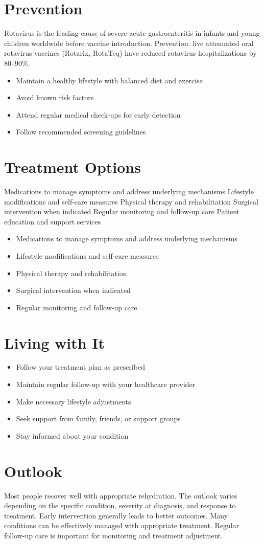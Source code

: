 \section{Prevention}
Rotavirus is the leading cause of severe acute gastroenteritis in infants and young children worldwide before vaccine introduction. Prevention: live attenuated oral rotavirus vaccines (Rotarix, RotaTeq) have reduced rotavirus hospitalizations by 80--90\%.

\begin{itemize}[noitemsep]
  \item Maintain a healthy lifestyle with balanced diet and exercise
  \item Avoid known risk factors
  \item Attend regular medical check-ups for early detection
  \item Follow recommended screening guidelines
\end{itemize}
\section{Treatment Options}
Medications to manage symptoms and address underlying mechanisms Lifestyle modifications and self-care measures Physical therapy and rehabilitation Surgical intervention when indicated Regular monitoring and follow-up care Patient education and support services

\begin{itemize}[noitemsep]
  \item Medications to manage symptoms and address underlying mechanisms
  \item Lifestyle modifications and self-care measures
  \item Physical therapy and rehabilitation
  \item Surgical intervention when indicated
  \item Regular monitoring and follow-up care
\end{itemize}
\section{Living with It}
\begin{itemize}[noitemsep]
  \item Follow your treatment plan as prescribed
  \item Maintain regular follow-up with your healthcare provider
  \item Make necessary lifestyle adjustments
  \item Seek support from family, friends, or support groups
  \item Stay informed about your condition
\end{itemize}
\section{Outlook}
Most people recover well with appropriate rehydration. The outlook varies depending on the specific condition, severity at diagnosis, and response to treatment. Early intervention generally leads to better outcomes. Many conditions can be effectively managed with appropriate treatment. Regular follow-up care is important for monitoring and treatment adjustment.
